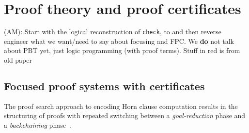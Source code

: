 \section{Proof theory and proof certificates}
\label{sec:three}


\begin{metanote}
  (AM): Start with the logical reconstruction of \texttt{check}, to and then reverse engineer what we want/need to say about focusing and FPC. We \textbf{do} not talk about PBT yet, just logic programming (with proof terms). %
%
Stuff in red is from old paper
\end{metanote}

\subsection{Focused proof systems with certificates}
\label{ssec:focused}


The proof search approach to encoding Horn clause computation
results in the structuring of proofs with repeated
switching between a \emph{goal-reduction} phase and a
\emph{backchaining} phase~\cite{miller91apal}.


